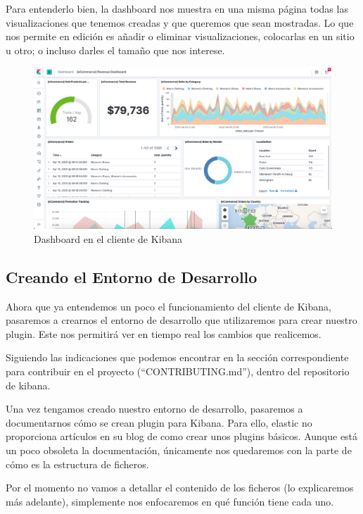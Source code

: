 \documentclass[a4paper, 12pt]{book}
\begin{document}
Para entenderlo bien, la dashboard nos muestra en una misma página todas las visualizaciones que tenemos creadas y que queremos que sean mostradas. Lo que nos permite en edición es añadir o eliminar visualizaciones, colocarlas en un sitio u otro; o incluso darles el tamaño que nos interese.

\begin{figure}[H]
  \centering
  \includegraphics[width=12cm, keepaspectratio]{img/development/kibana-dashboard.png}
  \caption{Dashboard en el cliente de Kibana}
  \label{fig:kibanadashboard}
\end{figure}


\subsection{Creando el Entorno de Desarrollo}

Ahora que ya entendemos un poco el funcionamiento del cliente de Kibana, pasaremos a crearnos el entorno de desarrollo que utilizaremos para crear nuestro plugin. Este nos permitirá ver en tiempo real los cambios que realicemos.

Siguiendo las indicaciones que podemos encontrar en la sección correspondiente para contribuir en el proyecto (“CONTRIBUTING.md”), dentro del repositorio de kibana.

Una vez tengamos creado nuestro entorno de desarrollo, pasaremos a documentarnos cómo se crean plugin para Kibana. Para ello, elastic no proporciona artículos en su blog de como crear unos plugins básicos. Aunque está un poco obsoleta la documentación, únicamente nos quedaremos con la parte de cómo es la estructura de ficheros.

Por el momento no vamos a detallar el contenido de los ficheros (lo explicaremos más adelante), simplemente nos enfocaremos en qué función tiene cada uno.
\end{document}
